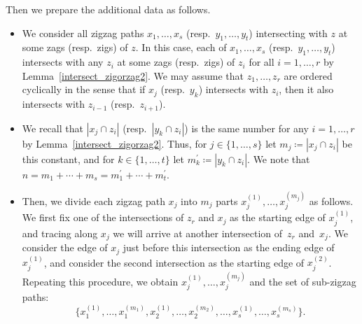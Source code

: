 \begin{setting}
Then we prepare the additional data as follows.
\begin{itemize}\itemsep=0pt
\item[(1)] We consider all zigzag paths $x_1,\dots, x_s$ (resp.~$y_1,\dots, y_t$) intersecting with $z$ at some zags (resp.\ zigs) of $z$.
In this case, each of $x_1,\dots, x_s$ (resp.\ $y_1,\dots, y_t$) intersects with any $z_i$ at some zags (resp.\ zigs) of $z_i$ for all $i=1,\dots,r$ by Lemma~\ref{intersect_zigorzag2}.
We may assume that $z_1,\dots,z_r$ are ordered cyclically in the sense that if $x_j$ (resp.~$y_k$) intersects with $z_i$,
then it also intersects with $z_{i-1}$ (resp.~$z_{i+1}$).
\item[(2)]
We recall that $|x_j\cap z_i|$ (resp.~$|y_k\cap z_i|$) is the same number for any $i=1,\dots,r$ by Lemma~\ref{intersect_zigorzag2}.
Thus, for $j\in\{1,\dots, s\}$ let $m_j\coloneqq|x_j\cap z_i|$ be this constant, and for $k\in\{1,\dots, t\}$ let $m^\prime_k\coloneqq|y_k\cap z_i|$.
We note that $n=m_1+\cdots+m_s=m^\prime_1+\cdots+m^\prime_t$.
\item[(3)] Then, we divide each zigzag path $x_j$ into $m_j$ parts $x_j^{(1)},\dots,x_j^{(m_j)}$ as follows.
We first fix one of the intersections of $z_r$ and $x_j$ as the starting edge of $x_j^{(1)}$,
and tracing along $x_j$ we will arrive at another intersection of~$z_r$ and~$x_j$.
We consider the edge of $x_j$ just before this intersection as the ending edge of $x_j^{(1)}$, and consider the second intersection as the starting edge of $x_j^{(2)}$.
Repeating this procedure, we obtain $x_j^{(1)},\dots,x_j^{(m_j)}$ and the set of sub-zigzag paths:
\begin{equation}\label{subzigzag_x}
\big\{x_1^{(1)},\dots,x_1^{(m_1)}, x_2^{(1)},\dots,x_2^{(m_2)}, \dots, x_s^{(1)},\dots,x_s^{(m_s)}\big\}.
\end{equation}


\end{itemize}
\end{setting}
